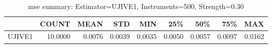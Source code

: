 \begin{table}[ht]
\centering
\caption{mse summary: Estimator=UJIVE1, Instruments=500, Strength=0.30}
\begin{tabular}{lrrrrrrrr}
\toprule
 & COUNT & MEAN & STD & MIN & 25\% & 50\% & 75\% & MAX \\
\midrule
UJIVE1 & 10.0000 & 0.0076 & 0.0039 & 0.0035 & 0.0050 & 0.0057 & 0.0097 & 0.0162 \\
\bottomrule
\end{tabular}
\end{table}
